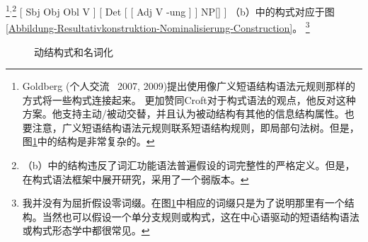 \footnote{%
  Goldberg (个人交流 \, 2007, 2009)提出使用像广义短语结构语法元规则那样的方式将一些构式连接起来。 \citet[]{Deppermann2006a}更加赞同Croft对于构式语法的观点，他反对这种方案。他支持主动/被动交替，并且认为被动结构有其他的信息结构属性。也要注意，广义短语结构语法元规则联系短语结构规则，即局部句法树。但是，图\ref{Abbildung-Resultativkonstruktion-Nominalisierung-Construction}中的结构是非常复杂的。
}$^,$\footnote{%
（b）中的结构违反了词汇功能语法\indexlfg 普遍假设的词完整性的严格定义。但是， \citet{Booij2005a,Booij2009a}在构式语法\indexcxg 框架中展开研究，采用了一个弱版本。
}
\eal
\ex {}[ Sbj Obj Obl V ]
\ex {}[ Det [ [ Adj V -ung ] ] NP[] ]
\zl
（b）中的构式对应于图\vref{Abbildung-Resultativkonstruktion-Nominalisierung-Construction}。
\footnote{%
  我并没有为屈折假设零词缀。在图\ref{Abbildung-Resultativkonstruktion-Nominalisierung-Construction}中相应的词缀只是为了说明那里有一个结构。当然也可以假设一个单分支规则或构式，这在中心语驱动的短语结构语法或构式形态学中都很常见。
}
\begin{figure}
\centering
{}
\caption{\label{Abbildung-Resultativkonstruktion-Nominalisierung-Construction}动结构式和名词化}
\end{figure}%
